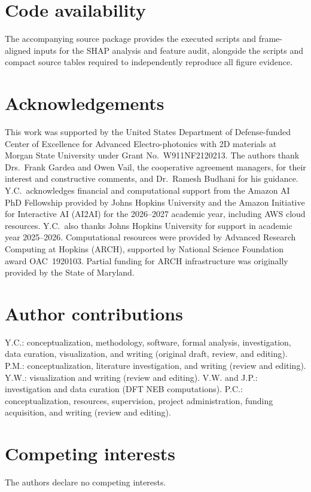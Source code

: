 \documentclass[pdflatex,sn-mathphys-num]{sn-jnl}
\newif\ifreviewcopy
\newcommand{\rev}[2]{\ifreviewcopy{\color{revisionblue}#2\textsuperscript{\scriptsize[R1-#1]}}\else#2\fi}
\begin{document}
\section*{Code availability}
\rev{C13}{The accompanying source package provides the executed scripts and frame-aligned inputs for the SHAP analysis and feature audit, alongside the scripts and compact source tables required to independently reproduce all figure evidence.}

\section*{Acknowledgements}
This work was supported by the United States Department of Defense-funded Center of Excellence for Advanced Electro-photonics with 2D materials at Morgan State University under Grant No.~W911NF2120213. The authors thank Drs.~Frank Gardea and Owen Vail, the cooperative agreement managers, for their interest and constructive comments, and Dr.~Ramesh Budhani for his guidance. Y.C.\ acknowledges financial and computational support from the Amazon AI PhD Fellowship provided by Johns Hopkins University and the Amazon Initiative for Interactive AI (AI2AI) for the 2026--2027 academic year, including AWS cloud resources. Y.C.\ also thanks Johns Hopkins University for support in academic year 2025--2026. Computational resources were provided by Advanced Research Computing at Hopkins (ARCH), supported by National Science Foundation award OAC~1920103. Partial funding for ARCH infrastructure was originally provided by the State of Maryland.

\section*{Author contributions}
Y.C.: conceptualization, methodology, software, formal analysis, investigation, data curation, visualization, and writing (original draft, review, and editing). P.M.: conceptualization, literature investigation, and writing (review and editing). Y.W.: visualization and writing (review and editing). V.W. and J.P.: investigation and data curation (DFT NEB computations). P.C.: conceptualization, resources, supervision, project administration, funding acquisition, and writing (review and editing).

\section*{Competing interests}
The authors declare no competing interests.


\end{document}
